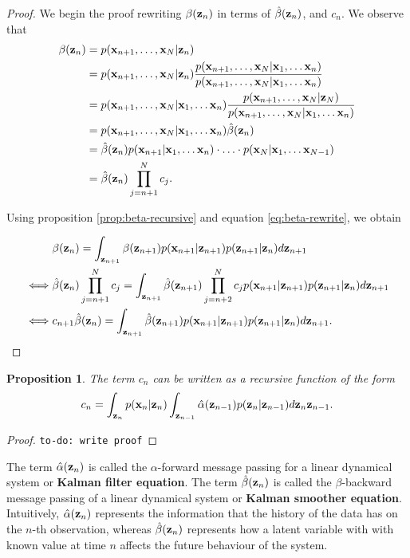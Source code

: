 \documentclass[11pt]{article}
\numberwithin{equation}{section}
\newcommand{\x}{{\bf x}}
\newcommand{\z}{{\bf z}}
\newtheorem{proposition}{Proposition}[section]
\begin{document}
\begin{proof}
	We begin the proof rewriting $\beta(\z_n)$ in terms of $\hat\beta(\z_n)$, and $c_n$. We observe that
	\begin{align}
		\beta(\z_n) &= p(\x_{n+1}, \ldots, \x_N \vert \z_n)\\
		&= p(\x_{n+1}, \ldots, \x_N \vert \z_n) \frac{p(\x_{n+1}, \ldots, \x_N \vert \x_1, \ldots \x_n)}{p(\x_{n+1}, \ldots, \x_N \vert \x_1, \ldots \x_n)} \\
		&= p(\x_{n+1}, \ldots, \x_N \vert \x_1, \ldots \x_n) \frac{p(\x_{n+1}, \ldots, \x_N \vert \z_N)}{p(\x_{n+1}, \ldots, \x_N \vert \x_1, \ldots \x_n)}\\
		&= p(\x_{n+1}, \ldots, \x_N \vert \x_1, \ldots \x_n) \hat\beta(\z_n)\\
		&= \hat\beta(\z_n) p(\x_{n+1} \vert \x_1, \ldots \x_n) \cdot \ldots \cdot p(\x_{N} \vert \x_1, \ldots \x_{N-1})\\
		&= \hat\beta(\z_n) \prod_{j=n+1}^N c_j \label{eq:beta-rewrite}.
	\end{align}
	
	Using proposition \ref{prop:beta-recursive} and equation \eqref{eq:beta-rewrite}, we obtain
	
	\begin{align}
		&\beta(\z_n) = \int_{\z_{n+1}} \beta(\z_{n+1})p(\x_{n+1}\vert \z_{n+1}) p(\z_{n+1}\vert \z_n) d\z_{n+1}\\
		\iff& \hat\beta(\z_n) \prod_{j=n+1}^N c_j = \int_{\z_{n+1}}\hat\beta(\z_{n+1}) \prod_{j=n+2}^N c_jp(\x_{n+1}\vert \z_{n+1}) p(\z_{n+1}\vert \z_n) d\z_{n+1}\\
		\iff& c_{n+1} \hat\beta(\z_n) = \int_{\z_{n+1}} \hat\beta(\z_{n+1}) p(\x_{n+1}\vert \z_{n+1}) p(\z_{n+1}\vert \z_n) d\z_{n+1}.
	\end{align}
\end{proof}

\begin{proposition}
	The term $c_n$ can be written as a recursive function of the form
	\begin{equation}
		c_n = \int_{\z_n} p(\x_n \vert \z_n) \int_{\z_{n-1}} \hat\alpha(\z_{n-1})p(\z_n \vert \z_{n-1}) d\z_n\z_{n-1}.
	\end{equation}
\end{proposition}

\begin{proof}
	\texttt{to-do: write proof}
\end{proof}

The term $\hat\alpha(\z_n)$ is called the $\alpha$-forward message passing for a linear dynamical system or \textbf{Kalman filter equation}.  The term $\hat\beta(\z_n)$ is called the $\beta$-backward message passing of a linear dynamical system or \textbf{Kalman smoother equation}. Intuitively, $\hat\alpha(\z_n)$ represents the information that the history of the data has on the $n$-th observation, whereas $\hat\beta(\z_n)$ represents how a latent variable with with known value at time $n$ affects the future behaviour of the system.
\end{document}
